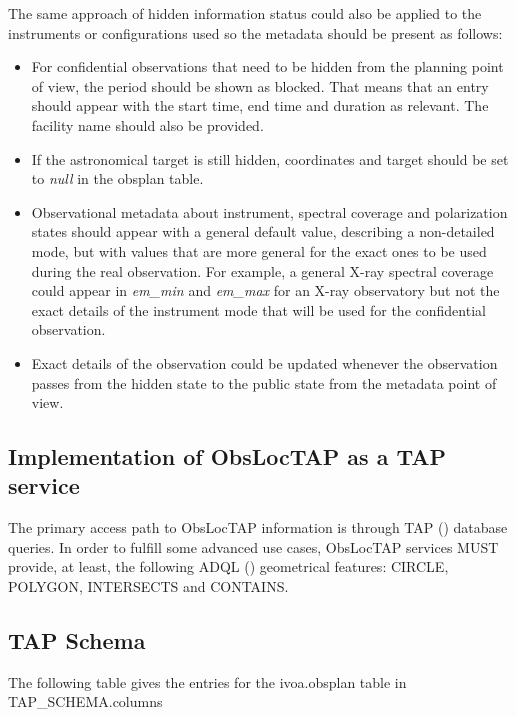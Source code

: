\documentclass[11pt,a4paper]{ivoa}
\begin{document}
The same approach of hidden information status could also be applied to the
instruments or configurations used so the metadata should be present as follows:

\begin{itemize}
	\item For confidential observations that need to be hidden from the planning point of view, the period should be shown as blocked. That means that an entry should appear with the start time, end time and duration as relevant. The facility name should also be provided.

	\item If the astronomical target is still hidden, coordinates and target should be set to \textit{null} in the obsplan table.

	\item Observational metadata about instrument, spectral coverage and polarization states should appear with a general default value, describing a non-detailed mode, but with values that are more general for the exact ones to be used during the real observation. For example, a general X-ray spectral coverage could appear in \textit{em\_min} and \textit{em\_max} for an X-ray observatory but not the exact details of the instrument mode that will be used for the confidential observation.

	\item Exact details of the observation could be updated whenever the observation passes from the hidden state to the public state from the metadata point of view.
\end{itemize}

\subsection{Implementation of ObsLocTAP as a TAP service}
The primary access path to ObsLocTAP information is through TAP 
(\cite{2010ivoa.spec.0327D}) database queries. In order to fulfill some advanced
use cases, ObsLocTAP services MUST provide, at least, the following ADQL
(\cite{2008ivoa.spec.1030O}) geometrical features: CIRCLE, POLYGON, INTERSECTS and 
CONTAINS.\par

\subsection{TAP Schema}
The following table gives the entries for the ivoa.obsplan table in TAP\_SCHEMA.columns
\end{document}

